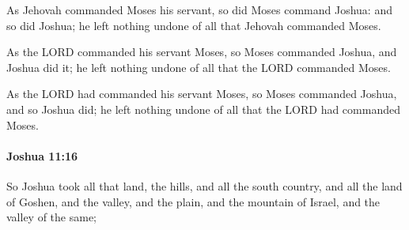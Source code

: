 			\begin{versebox}
					\item[BHS] 
					\item[ASV] As Jehovah commanded Moses his servant, so did Moses command Joshua: and so did Joshua; he left nothing undone of all that Jehovah commanded Moses.
					\item[NIV] As the LORD commanded his servant Moses, so Moses commanded Joshua, and Joshua did it; he left nothing undone of all that the LORD commanded Moses.
					\item[NRSV] As the LORD had commanded his servant Moses, so Moses commanded Joshua, and so Joshua did; he left nothing undone of all that the LORD had commanded Moses.
			\end{versebox}

		\paragraph{Joshua 11:16} %
			\label{JOSHUA-11-16}

			So Joshua took all that land, the hills, and all the south country, and all the land of Goshen, and the valley, and the plain, and the mountain of Israel, and the valley of the same;

